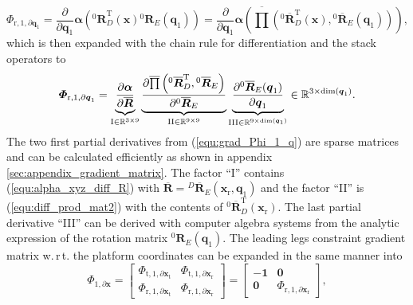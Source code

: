 \documentclass[robotics,article,submit,moreauthors,pdftex]{Definitions/mdpi}
\newcommand{\bm}[1]{\boldsymbol{#1}}
\newcommand{\rotmat}[2]{{{ }^{#1}\boldsymbol{R}}_{#2}}
\newcommand{\rotmato}[2]{{{ }^{#1}\boldsymbol{\overline{R}}}_{#2}}
\newcommand{\transp}[0]{{\mathrm{T}}}
\let\Phi\varPhi
\begin{document}
\begin{equation}
\bm{\Phi}_{\mathrm{r},1,\partial\bm{q}_1}
=
\frac{\partial}{\partial \bm{q}_1} \bm{\alpha}\left(\rotmat{0}{D}^\transp(\bm{x}) \rotmat{0}{E}(\bm{q}_1)\right)
=
\frac{\partial}{\partial \bm{q}_1} \bm{\alpha}\left(\overline{\prod}\left( \rotmato{0}{D}^\transp(\bm{x}), \rotmato{0}{E}(\bm{q}_1)\right)\right), \label{equ:grad_Phi_1_q_part1}
\end{equation}
%
which is then expanded with the chain rule for differentiation and the stack operators to
%
\begin{equation}
\bm{\Phi}_{\mathrm{r},1,\partial\bm{q}_1}
=
\underbrace{
	\vphantom{\frac{\partial \overline{\prod}\left(\rotmato{0}{D}^\transp, \rotmato{0}{E}\right)}{\partial \rotmato{0}{E}}}
	\frac{\partial \bm{\alpha}}{\partial \overline{\bm{R}}}
	}_{\mathrm{I} \in {\mathbb{R}}^{3 \times 9}}
\underbrace{
	\frac{\partial \overline{\prod}\left(\rotmato{0}{D}^\transp, \rotmato{0}{E}\right)}{\partial \rotmato{0}{E}}
	}_{\mathrm{II} \in {\mathbb{R}}^{9 \times 9}}
\underbrace{
	\vphantom{\frac{\partial \overline{\prod}\left(\rotmato{0}{D}^\transp, \rotmato{0}{E}\right)}{\partial \rotmato{0}{E}}}
	\frac{\partial \rotmato{0}{E}(\bm{q}_1)}{\partial \bm{q}_1}
	}_{\mathrm{III} \in {\mathbb{R}}^{9 \times \mathrm{dim}(\bm{q}_1)}}
\in {\mathbb{R}}^{3 \times \mathrm{dim}(\bm{q}_1)}.
\label{equ:grad_Phi_1_q}
\end{equation}
%
The two first partial derivatives from (\ref{equ:grad_Phi_1_q}) are sparse matrices and can be calculated efficiently as shown in appendix \ref{sec:appendix_gradient_matrix}.
The factor ``I'' contains (\ref{equ:alpha_xyz_diff_R}) with $\overline{\bm{R}}=\rotmato{D}{E}(\bm{x}_{\mathrm{r}},\bm{q}_1)$  and the factor ``II'' is (\ref{equ:diff_prod_mat2}) with the contents of $\rotmato{0}{D}^\transp(\bm{x}_{\mathrm{r}})$.
The last partial derivative ``III'' can be derived with computer algebra systems from the analytic expression of the rotation matrix $\rotmat{0}{E}(\bm{q}_1)$.
The leading legs constraint gradient matrix w.\,r\,t. the platform coordinates can be expanded in the same manner into
%
\begin{equation}
\bm{\Phi}_{1,\partial\bm{x}}
=
\begin{bmatrix}
\bm{\Phi}_{\mathrm{t},1,\partial\bm{x}_\mathrm{t}} & \bm{\Phi}_{\mathrm{t},1,\partial\bm{x}_\mathrm{r}} \\
\bm{\Phi}_{\mathrm{r},1,\partial\bm{x}_\mathrm{t}} &
\bm{\Phi}_{\mathrm{r},1,\partial\bm{x}_\mathrm{r}}
\end{bmatrix}
=
\begin{bmatrix}
-\bm{1} & \bm{0} \\
\bm{0} &
\bm{\Phi}_{\mathrm{r},1,\partial\bm{x}_\mathrm{r}}
\end{bmatrix},
\label{equ:Phi_1_grad_x}
\end{equation}
\end{document}
